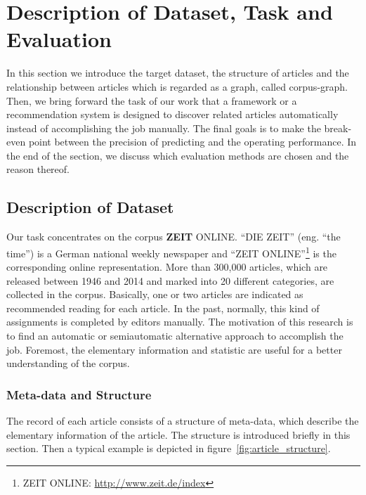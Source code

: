 \section{Description of Dataset, Task and Evaluation}
\label{sec:3}

In this section we introduce the target dataset, the structure of articles and the relationship between articles which is regarded as a graph, called corpus-graph. Then, we bring forward the task of our work that a framework or a recommendation system is designed to discover related articles automatically instead of accomplishing the job manually. The final goals is to make the break-even point between the precision of predicting and the operating performance. In the end of the section, we discuss which evaluation methods are chosen and the reason thereof. 

\subsection{Description of Dataset}
\label{sec:3.1}

Our task concentrates on the corpus \textbf{ZEIT} ONLINE. ``DIE ZEIT'' (eng. ``the time'') is a German national weekly newspaper and ``ZEIT ONLINE''\footnote{ZEIT ONLINE: \url{http://www.zeit.de/index}} is the corresponding online representation. More than 300,000 articles, which are released between 1946 and 2014 and marked into 20 different categories, are collected in the corpus. Basically, one or two articles are indicated as recommended reading for each article. In the past, normally, this kind of assignments is completed by editors manually. The motivation of this research is to find an automatic or semiautomatic alternative approach to accomplish the job. Foremost, the elementary information and statistic are useful for a better understanding of the corpus. 

\subsubsection{Meta-data and Structure}
\label{sec:3structure}

The record of each article consists of a structure of meta-data, which describe the elementary information of the article. The structure is introduced briefly in this section. Then a typical example is depicted in figure~\ref{fig:article_structure}.



